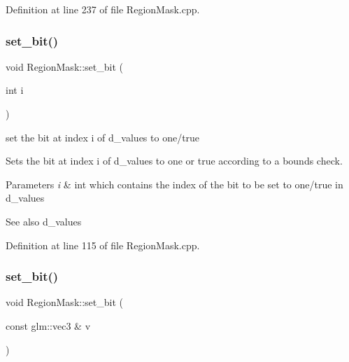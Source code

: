 Definition at line 237 of file Region\+Mask.\+cpp.

\mbox{\label{class_region_mask_a497298f97da4812e923a0b8e29ab9d23}} 
\subsubsection{\texorpdfstring{set\_bit()}{set\_bit()}\hspace{0.1cm}{\footnotesize\ttfamily [1/2]}}
{\footnotesize\ttfamily void Region\+Mask\+::set\+\_\+bit (\begin{DoxyParamCaption}\item[{int}]{i }\end{DoxyParamCaption})}



set the bit at index i of d\+\_\+values to one/true 

Sets the bit at index i of d\+\_\+values to one or true according to a bounds check.


\begin{DoxyParams}{Parameters}
{\em i} & int which contains the index of the bit to be set to one/true in d\+\_\+values\\
\hline
\end{DoxyParams}
\begin{DoxySeeAlso}{See also}
d\+\_\+values 
\end{DoxySeeAlso}


Definition at line 115 of file Region\+Mask.\+cpp.

\mbox{\label{class_region_mask_a1f4a7ce3ec3c48edbbc064e78159b823}} 
\subsubsection{\texorpdfstring{set\_bit()}{set\_bit()}\hspace{0.1cm}{\footnotesize\ttfamily [2/2]}}
{\footnotesize\ttfamily void Region\+Mask\+::set\+\_\+bit (\begin{DoxyParamCaption}\item[{const glm\+::vec3 \&}]{v }\end{DoxyParamCaption})}



